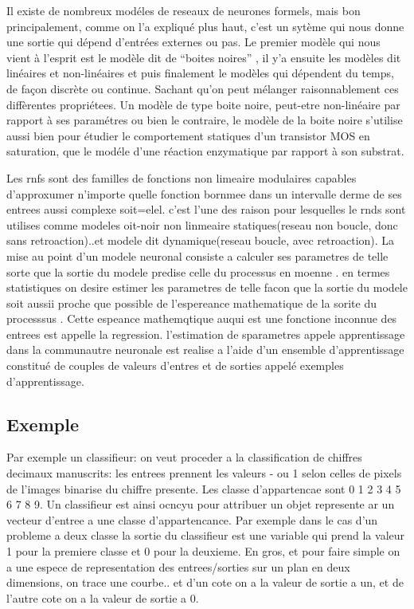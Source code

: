 Il existe de nombreux mod\'eles de reseaux de neurones formels, mais
bon principalement, comme on l'a expliqu\'e plus haut, c'est un
syt\`eme qui nous donne une sortie qui d\'epend d'entr\'ees externes
ou pas. Le premier mod\`ele qui nous vient \`a l'esprit est le
mod\`ele dit de ``boites noires'' , il y'a ensuite les mod\`eles dit
lin\'eaires et non-lin\'eaires et puis finalement le mod\`eles qui
d\'ependent du temps, de fa\c con discr\`ete ou continue. Sachant
qu'on peut m\'elanger raisonnablement ces diff\`erentes propri\'etees.
Un mod\`ele de type boite noire, peut-etre non-lin\'eaire par rapport
\`a ses param\'etres ou bien le contraire, le mod\`ele de la boite
noire s'utilise aussi bien pour \'etudier le comportement statiques
d'un transistor MOS en saturation, que le mod\'ele d'une r\'eaction
enzymatique par rapport \`a son substrat.

Les rnfs sont des familles de fonctions non limeaire modulaires
capables d'approxumer n'importe quelle fonction bornmee dans un
intervalle derme de ses entrees aussi complexe soit=elel. c'est l'une
des raison pour lesquelles le rnds sont utilises comme modeles
oit-noir non linmeaire statiques(reseau non boucle, donc sans
retroaction)..et modele dit dynamique(reseau boucle, avec
retroaction). La mise au point d'un modele neuronal consiste a
calculer ses parametres de telle sorte que la sortie du modele predise
celle du processus en moenne . en termes statistiques on desire
estimer les parametres de telle facon que la sortie du modele soit
aussii proche que possible de l'espereance mathematique de la sorite
du processsus . Cette espeance mathemqtique auqui est une fonctione
inconnue des entrees est appelle la regression. l'estimation de
sparametres appele apprentissage dans la communautre neuronale est
realise  a l'aide d'un ensemble d'apprentissage constitu\'e de couples
de valeurs d'entres et de sorties appel\'e exemples d'apprentissage.

\subsection{Exemple}
Par exemple un classifieur: on veut proceder a la classification de
chiffres decimaux manuscrits: les entrees prennent les valeurs - ou 1
selon celles de pixels de l'images binarise du chiffre presente. Les
classe d'appartencae sont {0 1 2 3 4 5 6 7 8 9}.
Un classifieur est ainsi ocncyu pour attribuer un objet represente ar
un vecteur d'entree a une classe d'appartencance. Par exemple dans le
cas d'un probleme a deux classe la sortie du classifieur est une
variable qui prend la valeur 1 pour la premiere classe et 0 pour la
deuxieme.
En gros, et pour faire simple on a une espece de representation des
entrees/sorties sur un plan en deux dimensions, on trace une
courbe.. et d'un cote on a la valeur de sortie a un, et de l'autre
cote on a la valeur de sortie a 0.

